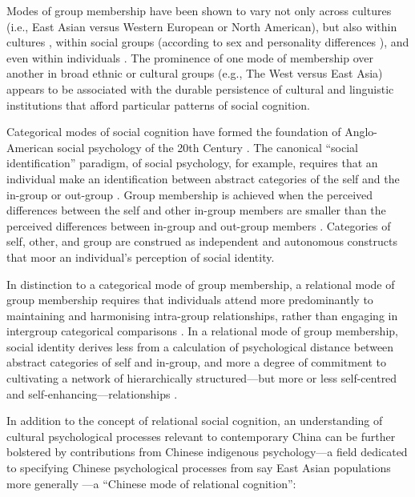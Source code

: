 \begin{CJK}{UTF8}{gbsn}
Modes of group membership have been shown to vary not only across cultures (i.e., East Asian versus Western European or North American), but also within cultures \citep{Henrich2014}, within social groups (according to sex and personality differences \citep{Yuki2014}), and even within individuals \citep[depending on contextual and situational primes, see][]{Lee2014,Wong2005}.  The prominence of one mode of membership over another in broad ethnic or cultural groups (e.g., The West versus East Asia) appears to be associated with the durable persistence of cultural and linguistic institutions that afford particular patterns of social cognition.

Categorical modes of social cognition have formed the foundation of Anglo-American social psychology of the 20th Century \citep{Liu2005}.  The canonical ``social identification'' paradigm, of social psychology, for example, requires that an individual make an identification between abstract categories of the self and the in-group or out-group \citep{Turner1987}.  Group membership is achieved when the perceived differences between the self and other in-group members are smaller than the perceived differences between in-group and out-group members \citep{Yuki2014}. Categories of self, other, and group are construed as independent and autonomous constructs that moor an individual's perception of social identity.

In distinction to a categorical mode of group membership, a relational mode of group membership requires that individuals attend more predominantly to maintaining and harmonising intra-group relationships, rather than engaging in intergroup categorical comparisons \citep{Yuki2003}.  In a relational mode of group membership, social identity derives less from a calculation of psychological distance between abstract categories of self and in-group, and more a degree of commitment to cultivating a network of hierarchically structured---but more or less self-centred and self-enhancing---relationships \citep{Liu2009,Nisbett2003}.

In addition to the concept of relational social cognition, an understanding of cultural psychological processes relevant to contemporary China can be further bolstered by contributions from Chinese indigenous psychology---a field dedicated to specifying Chinese psychological processes from say East Asian populations more generally \citep{Liu2009}—a ``Chinese mode of relational cognition'':


\end{CJK}
